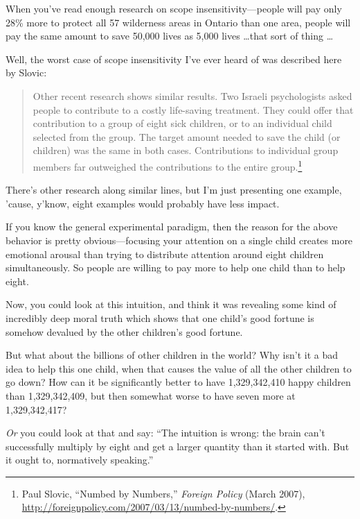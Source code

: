 {
 When you've read enough research on scope
insensitivity---people will pay only 28\% more to protect all 57
wilderness areas in Ontario than one area, people will pay the same
amount to save 50,000 lives as 5,000 lives \ldots that sort of thing
\ldots}

{
 Well, the worst case of scope insensitivity I've
ever heard of was described here by Slovic:}

\begin{quote}
{
 Other recent research shows similar results. Two Israeli
psychologists asked people to contribute to a costly life-saving
treatment. They could offer that contribution to a group of eight sick
children, or to an individual child selected from the group. The target
amount needed to save the child (or children) was the same in both
cases. Contributions to individual group members far outweighed the
contributions to the entire group.\footnote{Paul Slovic, ``Numbed by
Numbers,'' \textit{Foreign Policy} (March 2007),
\url{http://foreignpolicy.com/2007/03/13/numbed-by-numbers/}.}}
\end{quote}

{
 There's other research along similar lines, but
I'm just presenting one example,
'cause, y'know, eight examples would
probably have less impact.}

{
 If you know the general experimental paradigm, then the reason for
the above behavior is pretty obvious---focusing your attention on a
single child creates more emotional arousal than trying to distribute
attention around eight children simultaneously. So people are willing
to pay more to help one child than to help eight.}

{
 Now, you could look at this intuition, and think it was revealing
some kind of incredibly deep moral truth which shows that one
child's good fortune is somehow devalued by the other
children's good fortune.}

{
 But what about the billions of other children in the world? Why
isn't it a bad idea to help this one child, when that
causes the value of all the other children to go down? How can it be
significantly better to have 1,329,342,410 happy children than
1,329,342,409, but then somewhat worse to have seven more at
1,329,342,417?}

{
 \textit{Or} you could look at that and say: ``The
intuition is wrong: the brain can't successfully
multiply by eight and get a larger quantity than it started with. But
it ought to, normatively speaking.''}

